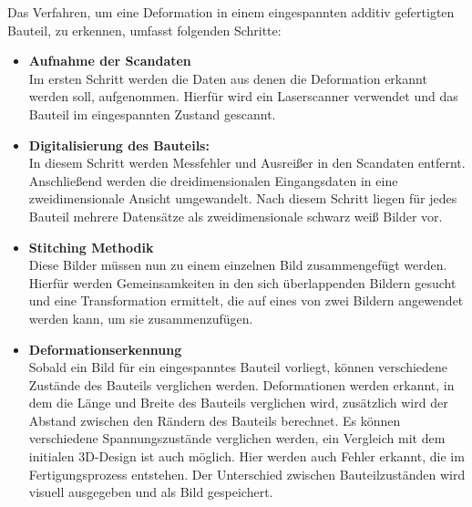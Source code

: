 Das Verfahren, um eine Deformation in einem eingespannten additiv gefertigten
Bauteil, zu erkennen, umfasst folgenden Schritte:
\begin{itemize}
    \item \textbf{Aufnahme der Scandaten}\\
        Im ersten Schritt werden die Daten aus denen die Deformation erkannt werden soll, 
        aufgenommen. Hierfür wird ein Laserscanner verwendet und das Bauteil im 
        eingespannten Zustand gescannt.
    \item \textbf{Digitalisierung des Bauteils:}\\
        In diesem Schritt werden Messfehler und Ausreißer
        in den Scandaten entfernt. Anschließend werden die dreidimensionalen 
        Eingangsdaten in eine zweidimensionale Ansicht umgewandelt.
        Nach diesem Schritt liegen für jedes Bauteil mehrere Datensätze als 
        zweidimensionale schwarz weiß Bilder vor.
    \item \textbf{Stitching Methodik}\\
        Diese Bilder müssen nun zu einem einzelnen Bild zusammengefügt werden.
        Hierfür werden Gemeinsamkeiten in den sich 
        überlappenden Bildern gesucht und eine Transformation ermittelt,
        die auf eines von zwei Bildern angewendet werden kann, um sie zusammenzufügen.
    \item \textbf{Deformationserkennung}\\
        Sobald ein Bild für ein eingespanntes Bauteil vorliegt, können verschiedene 
        Zustände des Bauteils verglichen werden. Deformationen werden erkannt, in dem 
        die Länge und Breite des Bauteils verglichen wird, zusätzlich wird der 
        Abstand zwischen den Rändern des Bauteils berechnet. Es können verschiedene
        Spannungszustände verglichen werden, ein Vergleich mit dem initialen 
        3D-Design ist auch möglich. Hier werden auch Fehler erkannt, die im 
        Fertigungsprozess entstehen. Der Unterschied zwischen Bauteilzuständen
        wird visuell ausgegeben und als Bild gespeichert.
        
\end{itemize}
























